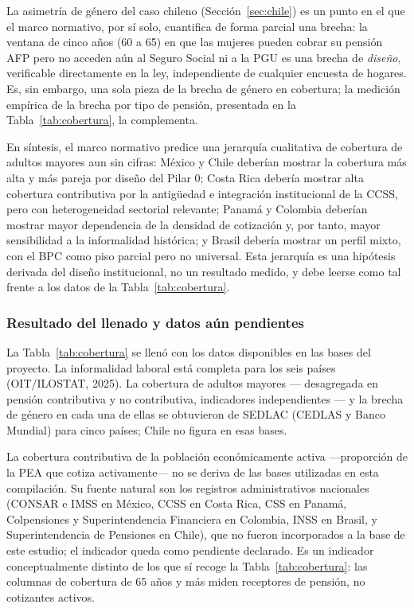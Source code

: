 \documentclass[12pt, letterpaper]{article}
\begin{document}
La asimetría de género del caso chileno (Sección~\ref{sec:chile}) es un punto en el que el marco normativo, por sí solo, cuantifica de forma parcial una brecha: la ventana de cinco años (60 a 65) en que las mujeres pueden cobrar su pensión AFP pero no acceden aún al Seguro Social ni a la PGU es una brecha de \textit{diseño}, verificable directamente en la ley, independiente de cualquier encuesta de hogares. Es, sin embargo, una sola pieza de la brecha de género en cobertura; la medición empírica de la brecha por tipo de pensión, presentada en la Tabla~\ref{tab:cobertura}, la complementa.

En síntesis, el marco normativo predice una jerarquía cualitativa de cobertura de adultos mayores aun sin cifras: México y Chile deberían mostrar la cobertura más alta y más pareja por diseño del Pilar 0; Costa Rica debería mostrar alta cobertura contributiva por la antigüedad e integración institucional de la CCSS, pero con heterogeneidad sectorial relevante; Panamá y Colombia deberían mostrar mayor dependencia de la densidad de cotización y, por tanto, mayor sensibilidad a la informalidad histórica; y Brasil debería mostrar un perfil mixto, con el BPC como piso parcial pero no universal. Esta jerarquía es una hipótesis derivada del diseño institucional, no un resultado medido, y debe leerse como tal frente a los datos de la Tabla~\ref{tab:cobertura}.

\subsubsection{Resultado del llenado y datos aún pendientes}

La Tabla~\ref{tab:cobertura} se llenó con los datos disponibles en las bases del proyecto. La informalidad laboral está completa para los seis países (OIT/ILOSTAT, 2025). La cobertura de adultos mayores --- desagregada en pensión contributiva y no contributiva, indicadores independientes --- y la brecha de género en cada una de ellas se obtuvieron de SEDLAC (CEDLAS y Banco Mundial) para cinco países; Chile no figura en esas bases.

La cobertura contributiva de la población económicamente activa ---proporción de
la PEA que cotiza activamente--- no se deriva de las bases utilizadas en esta
compilación. Su fuente natural son los registros administrativos nacionales
(CONSAR e IMSS en México, CCSS en Costa Rica, CSS en Panamá, Colpensiones y
Superintendencia Financiera en Colombia, INSS en Brasil, y Superintendencia de
Pensiones en Chile), que no fueron incorporados a la base de este estudio; el
indicador queda como pendiente declarado. Es un indicador conceptualmente distinto
de los que sí recoge la Tabla~\ref{tab:cobertura}: las columnas de cobertura de
65 años y más miden receptores de pensión, no cotizantes activos.
\end{document}
